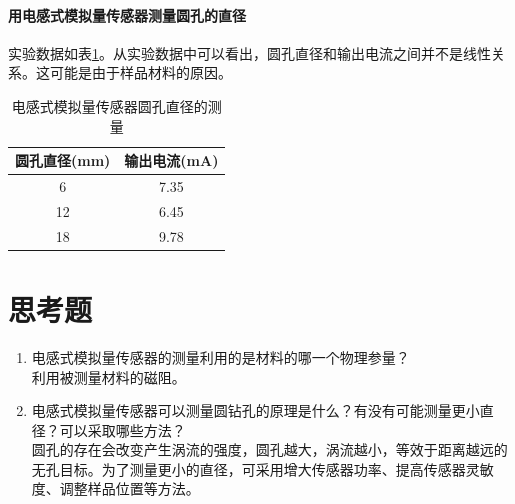 \paragraph{用电感式模拟量传感器测量圆孔的直径}
实验数据如表\ref{tab:ar}。从实验数据中可以看出，圆孔直径和输出电流之间并不是线性关系。这可能是由于样品材料的原因。
\begin{table}[htbp]
	\centering
	\begin{tabular}{|c|c|}
		\hline
		圆孔直径(mm) & 输出电流(mA) \\
		\hline
		6 & 7.35 \\
		12 & 6.45 \\
		18 & 9.78 \\
		\hline
	\end{tabular}
	\caption{电感式模拟量传感器圆孔直径的测量}
	\label{tab:ar}
\end{table}

\section{思考题}
\begin{enumerate}
\item 电感式模拟量传感器的测量利用的是材料的哪一个物理参量？\\
利用被测量材料的磁阻。
\item 电感式模拟量传感器可以测量圆钻孔的原理是什么？有没有可能测量更小直径？可以采取哪些方法？\\
圆孔的存在会改变产生涡流的强度，圆孔越大，涡流越小，等效于距离越远的无孔目标。为了测量更小的直径，可采用增大传感器功率、提高传感器灵敏度、调整样品位置等方法。
\end{enumerate}

